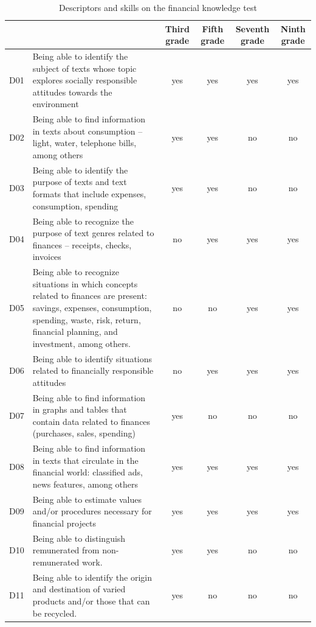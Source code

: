 \documentclass[
	article,			%
	12pt,				%
	oneside,			%
	a4paper,			%
	]{article}
\begin{document}
\begin{table}[h!]
  \centering
\begin{threeparttable}
  \fontsize{8}{11}\selectfont
  \caption{Descriptors and skills on the financial knowledge test}\label{tab:descriptors}
    \begin{tabular}{lp{30.93em}cccc}
    \toprule
 & \multicolumn{1}{r}{} & Third grade & Fifth grade    & Seventh grade  & Ninth grade  \\
    \midrule
    D01   & Being able to identify the subject of texts whose topic explores socially responsible attitudes towards the environment  & yes   & yes   & yes   & yes \\
    D02   & Being able to find information in texts about consumption – light, water, telephone bills, among others  & yes   & yes   & no    & no \\
    D03   & Being able to identify the purpose of texts and text formats that include expenses, consumption, spending  & yes   & yes   & no    & no \\
    D04   & Being able to recognize the purpose of text genres related to finances – receipts, checks, invoices & no    & yes   & yes   & yes \\
    D05   & Being able to recognize situations in which concepts related to finances are present: savings, expenses, consumption, spending, waste, risk, return, financial planning, and investment, among others.  & no    & no    & yes   & yes \\
    D06   & Being able to identify situations related to financially responsible attitudes  & no    & yes   & yes   & yes \\
    D07   & Being able to find information in graphs and tables that contain data related to finances (purchases, sales, spending) & yes   & no    & no    & no \\
    D08   & Being able to find information in texts that circulate in the financial world: classified ads, news features, among others & yes   & yes   & yes   & yes \\
    D09   & Being able to estimate values and/or procedures necessary for financial projects & yes   & yes   & yes   & yes \\
    D10   & Being able to distinguish remunerated from non-remunerated work. & yes   & yes   & no    & no \\
    D11   & Being able to identify the origin and destination of varied products and/or those that can be recycled. & yes   & no    & no    & no \\

\end{tabular}
\end{threeparttable}
\end{table}
\end{document}
